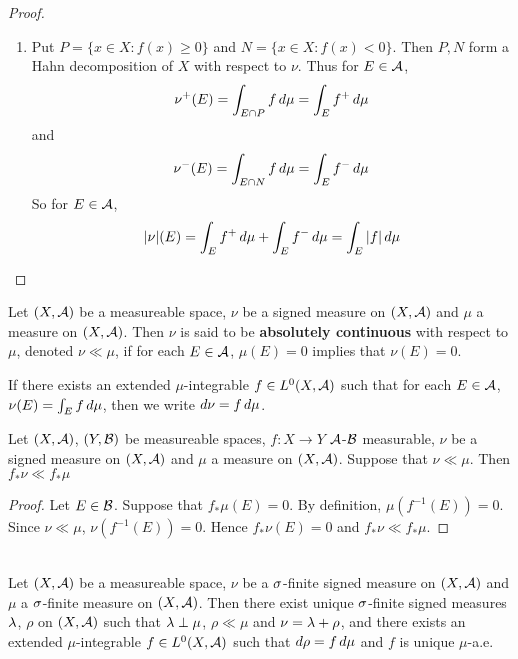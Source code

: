 \documentclass{book}
\begin{document}
\begin{proof}
\begin{enumerate}
			\item Put $P = \{x \in X: f(x) \geq 0\}$ and $N = \{x \in X: f(x) < 0\}$. Then $P,N$ form a Hahn decomposition of $X$ with respect to $\nu$. Thus for $E \in \mathcal{A}$, 
			$$\nu^+(E) = \int_{E \cap P} f \, d \mu = \int_E f^+ \, d \mu$$ and $$\nu^-(E) = \int_{E \cap N} f \, d \mu = \int_E f^- \, d \mu$$
			 So for $E \in \mathcal{A}$, $$|\nu|(E) = \int_E f^+ \, d \mu + \int_E f^- \, d \mu = \int_E |f| \, d \mu$$
		\end{enumerate}
	\end{proof}
	
	\begin{defn}  
		Let $(X, \mathcal{A})$ be a measureable space, $\nu$ be a signed measure on $(X, \mathcal{A})$ and $\mu$ a measure on $(X,\mathcal{A})$. Then $\nu$ is said to be \textbf{absolutely continuous} with respect to $\mu$, denoted $\nu \ll \mu$, if for each $E \in \mathcal{A}$, $\mu(E) = 0$ implies that $\nu(E) =0$. 
	\end{defn}
	
	\begin{note}
		If there exists an extended $\mu$-integrable $f \in L^0(X, \mathcal{A})$ such that for each $E \in \mathcal{A}$, $\nu(E) = \int_E f \, d \mu$, then we write $d\nu = f \, d \mu$.
	\end{note}
	
	\begin{ex}
	Let $(X, \mathcal{A})$, $(Y, \mathcal{B})$ be measureable spaces, $f:X \rightarrow Y$ $\mathcal{A}$-$\mathcal{B}$ measurable, $\nu$ be a signed measure on $(X, \mathcal{A})$ and $\mu$ a measure on $(X,\mathcal{A})$. Suppose that $\nu \ll \mu$. Then $f_*\nu \ll f_*\mu$
	\end{ex}
	
	\begin{proof}
	Let $E \in \mathcal{B}$. Suppose that $f_*\mu(E) = 0$. By definition, $\mu(f^{-1}(E)) = 0$. Since $\nu \ll \mu$, $\nu(f^{-1}(E)) = 0$. Hence $f_*\nu(E) = 0$ and $f_*\nu \ll f_*\mu$.
	\end{proof}
	
	\begin{thm}  \\
		Let $(X, \mathcal{A})$ be a measureable space, $\nu$ be a $\sigma$-finite signed measure on $(X, \mathcal{A})$ and $\mu$ a $\sigma$-finite measure on $(X,\mathcal{A})$. Then there exist unique $\sigma$-finite signed measures $\lambda$, $\rho$ on $(X, \mathcal{A})$ such that $\lambda \perp \mu$, $\rho \ll \mu$ and $\nu = \lambda + \rho$, and there exists an extended $\mu$-integrable $f \in L^0(X, \mathcal{A})$ such that $d\rho = f \, d \mu$ and $f$ is unique $\mu$-a.e.  
	\end{thm}
	
\end{document}

